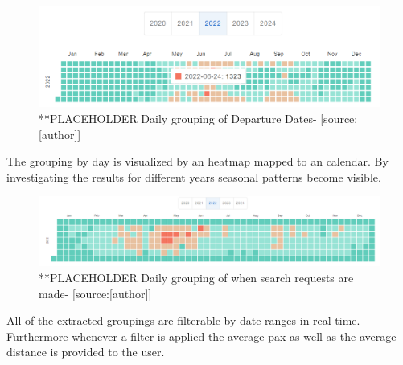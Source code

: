 \begin{figure}[H]
	\centering
		\includegraphics[width=15cm]{images/grouping_by_taskFrom}
	\caption{ **PLACEHOLDER Daily grouping of Departure Dates- [source:[author]]}
	\label{fig:grouping_dep_daily}
\end{figure}
The grouping by day is visualized by an heatmap mapped to an calendar. By investigating the results for different years seasonal patterns become visible.
\begin{figure}[H]
	\centering
		\includegraphics[width=15cm]{images/grouping_by_created_at}
	\caption{**PLACEHOLDER Daily grouping of when search requests are made- [source:[author]]}
	\label{fig:grouping_search_daily}
\end{figure}
All of the extracted groupings are filterable by date ranges in real time. Furthermore whenever a filter is applied the average pax as well as the average distance is provided to the user.